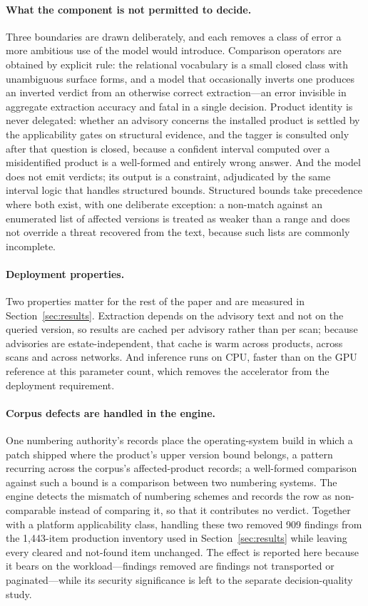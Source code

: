 \documentclass[fleqn,10pt,lineno]{wlpeerj}
\begin{document}
\paragraph{What the component is not permitted to decide.}
Three boundaries are drawn deliberately, and each removes a class of error a more ambitious use of the model would introduce. Comparison operators are obtained by explicit rule: the relational vocabulary is a small closed class with unambiguous surface forms, and a model that occasionally inverts one produces an inverted verdict from an otherwise correct extraction---an error invisible in aggregate extraction accuracy and fatal in a single decision. Product identity is never delegated: whether an advisory concerns the installed product is settled by the applicability gates on structural evidence, and the tagger is consulted only after that question is closed, because a confident interval computed over a misidentified product is a well-formed and entirely wrong answer. And the model does not emit verdicts; its output is a constraint, adjudicated by the same interval logic that handles structured bounds. Structured bounds take precedence where both exist, with one deliberate exception: a non-match against an enumerated list of affected versions is treated as weaker than a range and does not override a threat recovered from the text, because such lists are commonly incomplete.

\paragraph{Deployment properties.}
Two properties matter for the rest of the paper and are measured in Section~\ref{sec:results}. Extraction depends on the advisory text and not on the queried version, so results are cached per advisory rather than per scan; because advisories are estate-independent, that cache is warm across products, across scans and across networks. And inference runs on CPU, faster than on the GPU reference at this parameter count, which removes the accelerator from the deployment requirement.

\paragraph{Corpus defects are handled in the engine.}
One numbering authority's records place the operating-system build in which a patch shipped where the product's upper version bound belongs, a pattern recurring across the corpus's affected-product records; a well-formed comparison against such a bound is a comparison between two numbering systems. The engine detects the mismatch of numbering schemes and records the row as non-comparable instead of comparing it, so that it contributes no verdict. Together with a platform applicability class, handling these two removed 909 findings from the 1,443-item production inventory used in Section~\ref{sec:results} while leaving every cleared and not-found item unchanged. The effect is reported here because it bears on the workload---findings removed are findings not transported or paginated---while its security significance is left to the separate decision-quality study.
\end{document}
